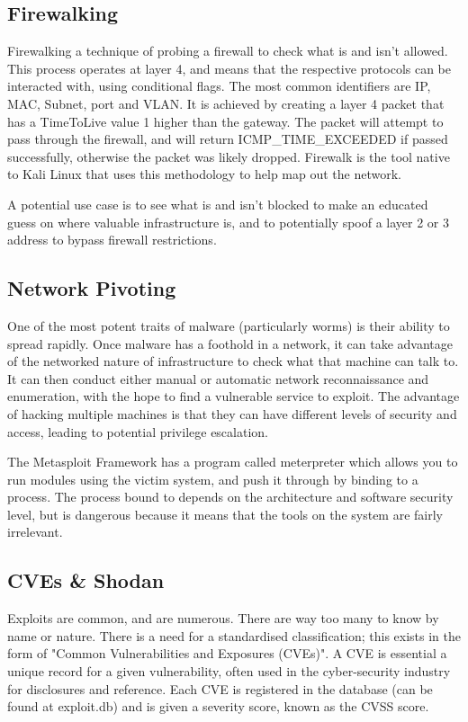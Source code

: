 \subsection{Firewalking}
Firewalking a technique of probing a firewall to check what is and isn't allowed. This process operates at layer 4, and means that the respective protocols can be interacted with, using conditional flags. The most common identifiers are IP, MAC, Subnet, port and VLAN.
It is achieved by creating a layer 4 packet that has a TimeToLive value 1 higher than the gateway. The packet will attempt to pass through the firewall, and will return ICMP_TIME_EXCEEDED if passed successfully, otherwise the packet was likely dropped. Firewalk is the tool native
to Kali Linux that uses this methodology to help map out the network. \citep{Firewalk}

A potential use case is to see what is and isn't blocked to make an educated guess on where valuable infrastructure is, and to potentially spoof a layer 2 or 3 address to bypass firewall restrictions.

\subsection{Network Pivoting}
One of the most potent traits of malware (particularly worms) is their ability to spread rapidly. Once malware has a foothold in a network, it can take advantage of the networked nature of infrastructure to check what that machine can talk to.
It can then conduct either manual or automatic network reconnaissance and enumeration, with the hope to find a vulnerable service to exploit. The advantage of hacking multiple machines is that they can have different levels of security and access, 
leading to potential privilege escalation. 

The Metasploit Framework has a program called meterpreter which allows you to run modules using the victim system, and push it through by binding to a process. The process bound to depends on the architecture and software security level, but is dangerous
because it means that the tools on the system are fairly irrelevant. 

\subsection{CVEs \& Shodan}
Exploits are common, and are numerous. There are way too many to know by name or nature. There is a need for a standardised classification; this exists in the form of "Common Vulnerabilities and Exposures (CVEs)". A CVE is essential a unique record for a given vulnerability,
often used in the cyber-security industry for disclosures and reference. Each CVE is registered in the database (can be found at exploit.db) and is given a severity score, known as the CVSS score. 


